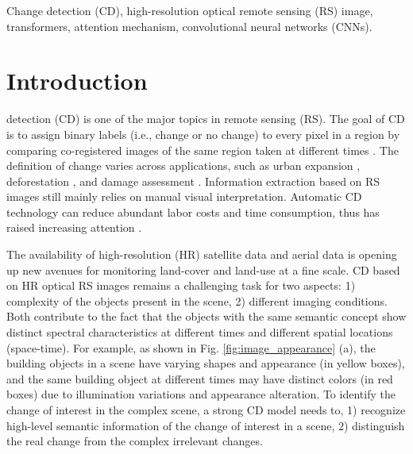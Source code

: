 \documentclass[journal]{IEEEtran}
\begin{document}
\begin{IEEEkeywords}
Change detection (CD), high-resolution optical remote sensing (RS) image, transformers, attention mechanism, convolutional neural networks (CNNs).

\end{IEEEkeywords}



\IEEEpeerreviewmaketitle




\section{Introduction}
\label{sec:intro}

 detection (CD) is one of the major topics in remote sensing (RS). The goal of CD is to assign binary labels (i.e., change or no change) to every pixel in a region by comparing co-registered images of the same region taken at different times \cite{SINGH1989}. The definition of change varies across applications, such as urban expansion \cite{Chen2020e}, deforestation \cite{Bem2020}, and damage assessment \cite{Xu2019}. Information extraction based on RS images still mainly relies on manual visual interpretation. Automatic CD technology can reduce abundant labor costs and time consumption, thus has raised increasing attention \cite{Shi2020, Chen2020, Chen2020e, Zhang2019c, Zhang2020a, Liu2019b, Zhang2020b, Peng2020a, Jiang2020, Diakogiannis2020}.


The availability of high-resolution (HR) satellite data and aerial data is opening up new avenues for monitoring land-cover and land-use at a fine scale. CD based on HR optical RS images remains a challenging task for two aspects: 1) complexity of the objects present in the scene, 2) different imaging conditions. Both contribute to the fact that the objects with the same semantic concept show distinct spectral characteristics at different times and different spatial locations (space-time). For example, as shown in Fig. \ref{fig:image_appearance} (a), the building objects in a scene have varying shapes and appearance (in yellow boxes), and the same building object at different times may have distinct colors (in red boxes) due to illumination variations and appearance alteration. To identify the change of interest in the complex scene, a strong CD model needs to, 1) recognize high-level semantic information of the change of interest in a scene, 2) distinguish the real change from the complex irrelevant changes.
\end{document}
